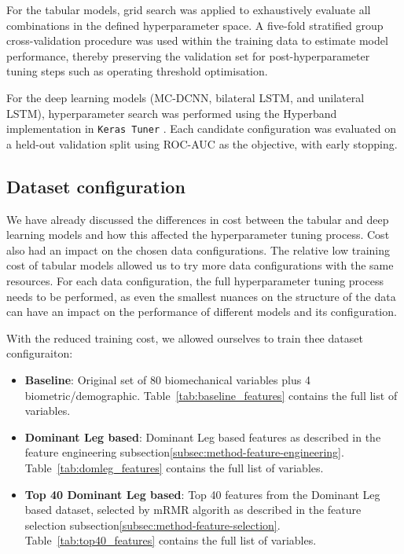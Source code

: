 For the tabular models, grid search was applied to exhaustively evaluate all combinations in the defined hyperparameter space. A five-fold stratified group cross-validation procedure was used within the training data to estimate model performance, thereby preserving the validation set for post-hyperparameter tuning steps such as operating threshold optimisation.

For the deep learning models (MC-DCNN, bilateral LSTM, and unilateral LSTM), hyperparameter search was performed using the Hyperband implementation in \texttt{Keras Tuner} \citep{Li2018Hyperband}. Each candidate configuration was evaluated on a held-out validation split using ROC-AUC as the objective, with early stopping.

\subsection{Dataset configuration}\label{subsec:method-data-config}
We have already discussed the differences in cost between the tabular and deep learning models and how this affected the hyperparameter tuning process. Cost also had an impact on the chosen data configurations. The relative low training cost of tabular models allowed us to try more data configurations with the same resources. For each data configuration, the full hyperparameter tuning process needs to be performed, as even the smallest nuances on the structure of the data can have an impact on the performance of different models and its configuration.

With the reduced training cost, we allowed ourselves to train thee dataset configuraiton:

\begin{itemize}
    \item \textbf{Baseline}: Original set of 80 biomechanical variables plus 4 biometric/demographic. Table~\ref{tab:baseline_features} contains the full list of variables.
    \item \textbf{Dominant Leg based}: Dominant Leg based features as described in the feature engineering subsection\ref{subsec:method-feature-engineering}. Table~\ref{tab:domleg_features} contains the full list of variables.
    \item \textbf{Top 40 Dominant Leg based}: Top 40 features from the Dominant Leg based dataset, selected by mRMR algorith as described in the feature selection subsection\ref{subsec:method-feature-selection}. Table~\ref{tab:top40_features} contains the full list of variables.
\end{itemize}

